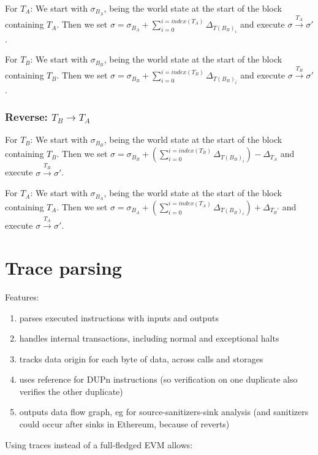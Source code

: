 \documentclass[draft,final]{vutinfth} %
\begin{document}
    For $T_A$: We start with $\sigma_{B_A}$, being the world state at the start of the block containing $T_A$. Then we set $\sigma = \sigma_{B_A} + \sum_{i=0}^{i=index(T_A)}\Delta_{T(B_B)_i}$ and execute $\sigma \xrightarrow{T_A} \sigma\prime$.

    For $T_B$: We start with $\sigma_{B_B}$, being the world state at the start of the block containing $T_B$. Then we set $\sigma = \sigma_{B_B} + \sum_{i=0}^{i=index(T_B)}\Delta_{T(B_B)_i}$ and execute $\sigma \xrightarrow{T_B} \sigma\prime$.

    \subsubsection{Reverse: $T_B \rightarrow T_A$}


    For $T_B$: We start with $\sigma_{B_B}$, being the world state at the start of the block containing $T_B$. Then we set $\sigma = \sigma_{B_B} + (\sum_{i=0}^{i=index(T_B)}\Delta_{T(B_B)_i}) - \Delta_{T_A}$ and execute $\sigma \xrightarrow{T_B} \sigma\prime$.

    For $T_A$: We start with $\sigma_{B_A}$, being the world state at the start of the block containing $T_A$. Then we set $\sigma = \sigma_{B_A} + (\sum_{i=0}^{i=index(T_A)}\Delta_{T(B_B)_i}) + \Delta_{T_B\prime}$ and execute $\sigma \xrightarrow{T_A} \sigma\prime$.

    \section{Trace parsing}

    Features:

    \begin{enumerate}
        \item parses executed instructions with inputs and outputs
        \item handles internal transactions, including normal and exceptional halts
        \item tracks data origin for each byte of data, across calls and storages
        \item uses reference for DUPn instructions (so verification on one duplicate also verifies the other duplicate)
        \item outputs data flow graph, eg for source-sanitizers-sink analysis (and sanitizers could occur after sinks in Ethereum, because of reverts)
    \end{enumerate}

    Using traces instead of a full-fledged EVM allows:
\end{document}
